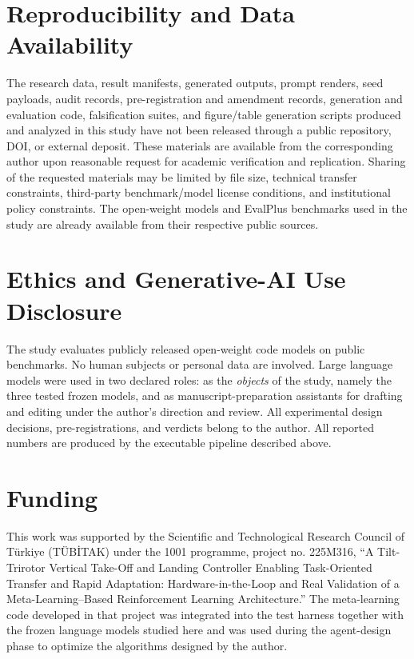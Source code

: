 \documentclass{article}
\numberwithin{equation}{section}  %
\theoremstyle{definition}
\begin{document}
\section*{Reproducibility and Data Availability}

The research data, result manifests, generated outputs, prompt renders, seed payloads,
audit records, pre-registration and amendment records, generation and evaluation code,
falsification suites, and figure/table generation scripts produced and analyzed in this
study have not been released through a public repository, DOI, or external deposit. These
materials are available from the corresponding author upon reasonable request for academic
verification and replication. Sharing of the requested materials may be limited by file size,
technical transfer constraints, third-party benchmark/model license conditions, and
institutional policy constraints. The open-weight models and EvalPlus benchmarks used in the
study are already available from their respective public sources.

\section*{Ethics and Generative-AI Use Disclosure}

The study evaluates publicly released open-weight code models on public benchmarks. No human
subjects or personal data are involved. Large language models were used in two declared roles:
as the \emph{objects} of the study, namely the three tested frozen models, and as
manuscript-preparation assistants for drafting and editing under the author's direction and
review. All experimental design decisions, pre-registrations, and verdicts belong to the
author. All reported numbers are produced by the executable pipeline described above.

\section*{Funding}

This work was supported by the Scientific and Technological Research Council of Türkiye
(TÜBİTAK) under the 1001 programme, project no. 225M316, “A Tilt-Trirotor Vertical Take-Off
and Landing Controller Enabling Task-Oriented Transfer and Rapid Adaptation:
Hardware-in-the-Loop and Real Validation of a Meta-Learning--Based Reinforcement Learning
Architecture.” The meta-learning code developed in that project was integrated into the test
harness together with the frozen language models studied here and was used during the
agent-design phase to optimize the algorithms designed by the author.
\end{document}
